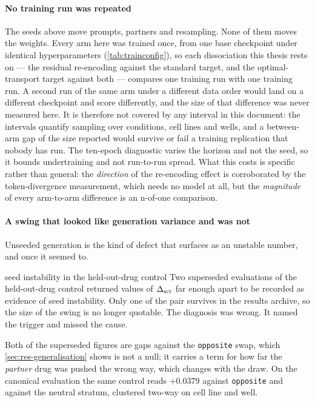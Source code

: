 \paragraph{No training run was repeated} The seeds above move prompts,
partners and resampling. None of them moves the weights. Every arm here was
trained once, from one base checkpoint under identical hyperparameters
(\cref{tab:trainconfig}), so each dissociation this thesis rests on --- the
residual re-encoding against the standard target, and the optimal-transport
target against both --- compares one training run with one training run. A
second run of the same arm under a different data order would land on a
different checkpoint and score differently, and the size of that difference was
never measured here. It is therefore not covered by any interval in this
document: the intervals quantify sampling over conditions, cell lines and wells,
and a between-arm gap of the size reported would survive or fail a training
replication that nobody has run. The ten-epoch diagnostic varies the horizon and
not the seed, so it bounds undertraining and not run-to-run spread. What this
costs is specific rather than general: the \emph{direction} of the re-encoding
effect is corroborated by the token-divergence measurement, which needs no
model at all, but the \emph{magnitude} of every arm-to-arm difference is an
n-of-one comparison.

\paragraph{A swing that looked like generation variance and was not} Unseeded
generation is the kind of defect that surfaces as an unstable number, and once
it seemed to.

\begin{withdrawn}{seed instability in the held-out-drug control}
Two superseded evaluations of the held-out-drug control returned values of
$\Delta_{\textrm{scr}}$ far enough apart to be recorded as evidence of seed instability. Only one
of the pair survives in the results archive, so the size of the swing is no
longer quotable. The diagnosis was wrong. It named the trigger and missed the
cause.
\end{withdrawn}

Both of the superseded figures are gaps against the \texttt{opposite} swap, which
\cref{sec:res-generalisation} shows is not a null; it carries a term for how far
the \emph{partner} drug was pushed the wrong way, which changes with the
draw. On the canonical evaluation the same
control reads $+0.0379$ against \texttt{opposite} and
 against the neutral stratum, clustered two-way on
cell line and well.

